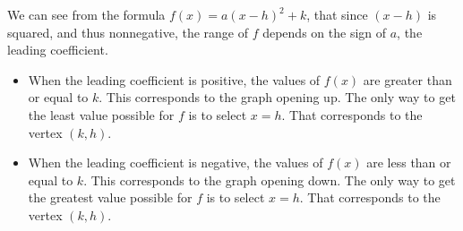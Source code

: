 \documentclass{ximera}
\begin{document}
\begin{image}
\end{image}











We can see from the formula $f(x) = a (x - h)^2 + k$, that since $(x - h)$ is squared, and thus nonnegative, the range of $f$ depends on the sign of $a$, the leading coefficient. \\


\begin{itemize}
     \item When the leading coefficient is positive, the values of $f(x)$ are greater than or equal to $k$. This corresponds to the graph opening up.  The only way to get the least value possible for $f$ is to select $x = h$. That corresponds to the vertex $(k, h)$. \\


     \item When the leading coefficient is negative, the values of $f(x)$ are less than or equal to $k$. This corresponds to the graph opening down.  The only way to get the greatest value possible for $f$ is to select $x = h$. That corresponds to the vertex $(k, h)$.  \\
\end{itemize}
\end{document}

